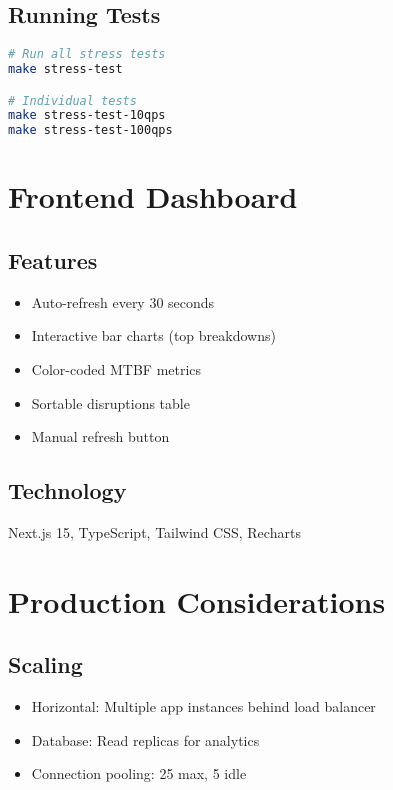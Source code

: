 \documentclass[11pt,a4paper]{article}
\begin{document}
\subsection{Running Tests}

\begin{lstlisting}[language=bash]
# Run all stress tests
make stress-test

# Individual tests
make stress-test-10qps
make stress-test-100qps
\end{lstlisting}

\section{Frontend Dashboard}

\subsection{Features}
\begin{itemize}[leftmargin=*]
    \item Auto-refresh every 30 seconds
    \item Interactive bar charts (top breakdowns)
    \item Color-coded MTBF metrics
    \item Sortable disruptions table
    \item Manual refresh button
\end{itemize}

\subsection{Technology}
Next.js 15, TypeScript, Tailwind CSS, Recharts

\section{Production Considerations}

\subsection{Scaling}
\begin{itemize}[leftmargin=*]
    \item Horizontal: Multiple app instances behind load balancer
    \item Database: Read replicas for analytics
    \item Connection pooling: 25 max, 5 idle
\end{itemize}
\end{document}
